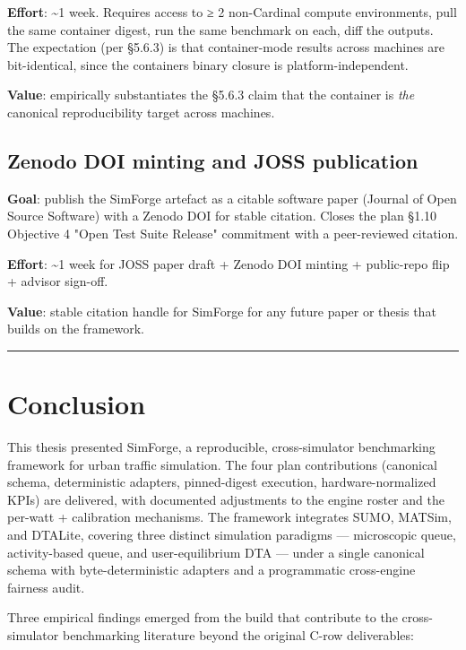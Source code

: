 \textbf{Effort}: \textasciitilde1 week. Requires access to ≥ 2
non-Cardinal compute environments, pull the same container digest, run
the same benchmark on each, diff the outputs. The expectation (per
§5.6.3) is that container-mode results across machines are
bit-identical, since the container\textquotesingle s binary closure is
platform-independent.

\textbf{Value}: empirically substantiates the §5.6.3 claim that the
container is \emph{the} canonical reproducibility target across
machines.

\subsection{Zenodo DOI minting and JOSS
publication}\label{657-zenodo-doi-minting-and-joss-publication}

\textbf{Goal}: publish the SimForge artefact as a citable software paper
(Journal of Open Source Software) with a Zenodo DOI for stable citation.
Closes the plan §1.10 Objective 4 "Open Test Suite Release"
commitment with a peer-reviewed citation.

\textbf{Effort}: \textasciitilde1 week for JOSS paper draft + Zenodo DOI
minting + public-repo flip + advisor sign-off.

\textbf{Value}: stable citation handle for SimForge for any future paper
or thesis that builds on the framework.

\begin{center}\rule{0.5\linewidth}{0.5pt}\end{center}

\section{Conclusion}\label{66-conclusion}

This thesis presented SimForge, a reproducible, cross-simulator
benchmarking framework for urban traffic simulation. The four plan
contributions (canonical schema, deterministic adapters, pinned-digest
execution, hardware-normalized KPIs) are delivered, with documented
adjustments to the engine roster and the per-watt + calibration
mechanisms. The framework integrates SUMO, MATSim, and DTALite, covering
three distinct simulation paradigms --- microscopic queue,
activity-based queue, and user-equilibrium DTA --- under a single
canonical schema with byte-deterministic adapters and a programmatic
cross-engine fairness audit.

Three empirical findings emerged from the build that contribute to the
cross-simulator benchmarking literature beyond the original C-row
deliverables:

